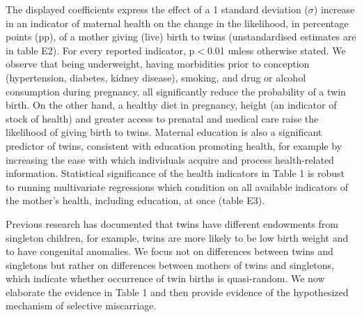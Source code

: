 \documentclass{nature}
\begin{document}
\begin{linenumbers}
The displayed coefficients express the effect of a 1 standard deviation ($\sigma$) increase in an indicator of maternal health on the change in the likelihood, in percentage points (pp), of a mother giving (live) birth to twins (unstandardised estimates are in table E2). For every reported indicator, p$<$0.01 unless otherwise stated. %
We observe that being underweight, having morbidities prior to conception (hypertension, diabetes, kidney disease), smoking, and drug or alcohol consumption during pregnancy, all significantly reduce the probability of a twin birth. On the other hand, a healthy diet in pregnancy, height (an indicator of stock of health\cite{Silventoinen2003,BhalotraRawlings2013}) and greater access to prenatal and medical care raise the likelihood of giving birth to twins. Maternal education is also a significant predictor of twins, consistent with education promoting health, for example by increasing the ease with which individuals acquire and process health-related information\cite{Kenkel1991,CutlerLlerasMuney2010}. %
Statistical significance of the health indicators in Table 1 is robust to running multivariate regressions which condition on all available indicators of the mother's health, including education, at once (table E3).

Previous research has documented that twins have different endowments from singleton children, for example, twins are more likely to be low birth weight and to have congenital anomalies\cite{Hall2003}. We focus not on differences between twins and singletons but rather on differences between mothers of twins and singletons, which indicate whether occurrence of twin births is quasi-random. We now elaborate the evidence in Table 1 and then provide evidence of the hypothesized mechanism of selective miscarriage.


\end{linenumbers}
\end{document}

